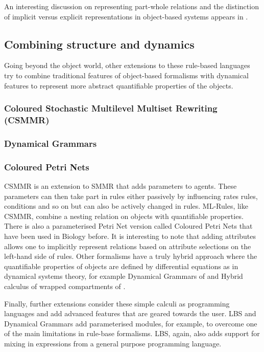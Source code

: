 \documentclass[phd]{infthesis}
\begin{document}
An interesting discussion on representing part-whole relations and the
distinction of implicit versus explicit representations in object-based
systems appears in \citet{}.

\subsection{Combining structure and dynamics}
Going beyond the object world, other extensions to these rule-based languages
try to combine traditional features of object-based formalisms with dynamical
features to represent more abstract quantifiable properties of the
objects.

\subsubsection*{Coloured Stochastic Multilevel Multiset Rewriting (CSMMR)}


\subsubsection*{Dynamical Grammars}


\subsubsection*{Coloured Petri Nets}
CSMMR is an extension to SMMR that adds parameters to agents. These
parameters can then take part in rules either passively by influencing rates
rules, conditions and so on but can also be actively changed in rules. ML-Rules,
like CSMMR, combine a nesting relation on objects with quantifiable
properties. There is also a parameterised Petri Net version called Coloured
Petri Nets that have been used in Biology before. It is interesting to note that
adding attributes allows one to implicitly represent relations based on
attribute selections on the left-hand side of rules.  Other formalisms have a
truly hybrid approach where the quantifiable properties of objects are defined
by differential equations as in dynamical systems theory, for example Dynamical
Grammars of \citep{} and Hybrid calculus of wrapped compartments of \citet{}.

Finally, further extensions consider these simple calculi as programming
languages and add advanced features that are geared towards the user. LBS and
Dynamical Grammars add parameterised modules, for example, to overcome one of
the main limitations in rule-base formalisms. LBS, again, also adds support for
mixing in expressions from a general purpose programming language.
\end{document}
